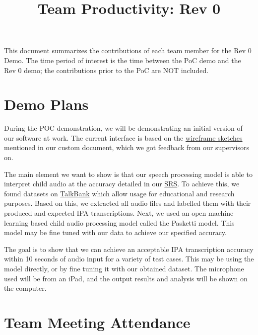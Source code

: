 \documentclass{article}
\title{Team Productivity: Rev 0\\\progname}
\author{\authname}
\date{}
\begin{document}
\maketitle

This document summarizes the contributions of each team member for the Rev 0
Demo.  The time period of interest is the time between the PoC demo and the Rev
0 demo; the contributions prior to the PoC are NOT included.

\section{Demo Plans}

During the POC demonstration, we will be demonstrating an initial version of our software at work. The current interface is based on the \href{https://github.com/lilyporter/Ghoti/blob/main/pdfs/CDs/Wireframe/Wireframe.pdf}{wireframe sketches} mentioned in our custom document, which we got feedback from our supervisors on. 

The main element we want to show is that our speech processing model is able to interpret child audio at the accuracy detailed in our \href{https://github.com/lilyporter/Ghoti/blob/main/pdfs/SRS/SRS.pdf}{SRS}. To achieve this, we found datasets on \href{https://talkbank.org/phon/}{TalkBank} which allow usage for educational and research purposes. Based on this, we extracted all audio files and labelled them with their produced and expected IPA transcriptions. Next, we used an open machine learning based child audio processing model called the Pasketti model. This model may be fine tuned with our data to achieve our specified accuracy. 

The goal is to show that we can achieve an acceptable IPA transcription accuracy within 10 seconds of audio input for a variety of test cases. This may be using the model directly, or by fine tuning it with our obtained dataset. The microphone used will be from an iPad, and the output results and analysis will be shown on the computer. 


\section{Team Meeting Attendance}

\end{document}
